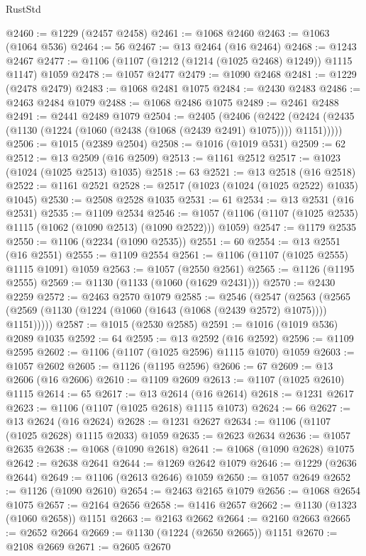 \begin{lexlean}{RustStd}
\begin{coremodule}
{\begin{coremodule}
{{{{{{{{{{{{{{{{{{{{{{{{{{{{{{{{{{{@2460 := @1229 (@2457 @2458)
@2461 := @1068 @2460
@2463 := @1063 (@1064 @536)
@2464 := 56
@2467 := @13 @2464 (@16 @2464)
@2468 := @1243 @2467
@2477 := @1106 (@1107 (@1212 (@1214 (@1025 @2468) @1249)) @1115 @1147) @1059
@2478 := @1057 @2477
@2479 := @1090 @2468
@2481 := @1229 (@2478 @2479)
@2483 := @1068 @2481 @1075
@2484 := @2430 @2483
@2486 := @2463 @2484 @1079
@2488 := @1068 @2486 @1075
@2489 := @2461 @2488
@2491 := @2441 @2489 @1079
@2504 := @2405
    (@2406
      (@2422 (@2424 (@2435 (@1130 (@1224 (@1060 (@2438 (@1068 (@2439 @2491) @1075)))) @1151)))))
@2506 := @1015 (@2389 @2504)
@2508 := @1016 (@1019 @531)
@2509 := 62
@2512 := @13 @2509 (@16 @2509)
@2513 := @1161 @2512
@2517 := @1023 (@1024 (@1025 @2513) @1035)
@2518 := 63
@2521 := @13 @2518 (@16 @2518)
@2522 := @1161 @2521
@2528 := @2517 (@1023 (@1024 (@1025 @2522) @1035) @1045)
@2530 := @2508 @2528 @1035
@2531 := 61
@2534 := @13 @2531 (@16 @2531)
@2535 := @1109 @2534
@2546 := @1057 (@1106 (@1107 (@1025 @2535) @1115 (@1062 (@1090 @2513) (@1090 @2522))) @1059)
@2547 := @1179 @2535
@2550 := @1106 (@2234 (@1090 @2535))
@2551 := 60
@2554 := @13 @2551 (@16 @2551)
@2555 := @1109 @2554
@2561 := @1106 (@1107 (@1025 @2555) @1115 @1091) @1059
@2563 := @1057 (@2550 @2561)
@2565 := @1126 (@1195 @2555)
@2569 := @1130 (@1133 (@1060 (@1629 @2431)))
@2570 := @2430 @2259
@2572 := @2463 @2570 @1079
@2585 := @2546
    (@2547
      (@2563 (@2565 (@2569 (@1130 (@1224 (@1060 (@1643 (@1068 (@2439 @2572) @1075)))) @1151)))))
@2587 := @1015 (@2530 @2585)
@2591 := @1016 (@1019 @536) @2089 @1035
@2592 := 64
@2595 := @13 @2592 (@16 @2592)
@2596 := @1109 @2595
@2602 := @1106 (@1107 (@1025 @2596) @1115 @1070) @1059
@2603 := @1057 @2602
@2605 := @1126 (@1195 @2596)
@2606 := 67
@2609 := @13 @2606 (@16 @2606)
@2610 := @1109 @2609
@2613 := @1107 (@1025 @2610) @1115
@2614 := 65
@2617 := @13 @2614 (@16 @2614)
@2618 := @1231 @2617
@2623 := @1106 (@1107 (@1025 @2618) @1115 @1073)
@2624 := 66
@2627 := @13 @2624 (@16 @2624)
@2628 := @1231 @2627
@2634 := @1106 (@1107 (@1025 @2628) @1115 @2033) @1059
@2635 := @2623 @2634
@2636 := @1057 @2635
@2638 := @1068 (@1090 @2618)
@2641 := @1068 (@1090 @2628) @1075
@2642 := @2638 @2641
@2644 := @1269 @2642 @1079
@2646 := @1229 (@2636 @2644)
@2649 := @1106 (@2613 @2646) @1059
@2650 := @1057 @2649
@2652 := @1126 (@1090 @2610)
@2654 := @2463 @2165 @1079
@2656 := @1068 @2654 @1075
@2657 := @2164 @2656
@2658 := @1416 @2657
@2662 := @1130 (@1323 (@1060 @2658)) @1151
@2663 := @2163 @2662
@2664 := @2160 @2663
@2665 := @2652 @2664
@2669 := @1130 (@1224 (@2650 @2665)) @1151
@2670 := @2108 @2669
@2671 := @2605 @2670
}}}}}}}}}}}}}}}}}}}}}}}}}}}}}}}}}}}
\end{coremodule}}
\end{coremodule}
\end{lexlean}

